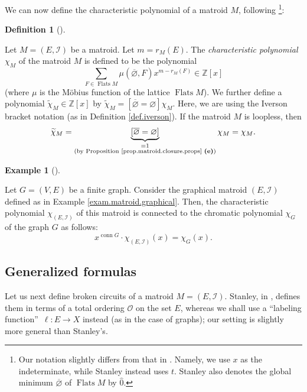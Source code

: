 \documentclass[numbers=enddot,12pt,final,onecolumn,notitlepage]{scrartcl}%
\theoremstyle{definition}
\newtheorem{defi}[theo]{Definition}
\newenvironment{definition}[1][]
{\begin{defi}[#1]\begin{leftbar}}
{\end{leftbar}\end{defi}}
\newtheorem{exmp}[theo]{Example}
\newenvironment{example}[1][]
{\begin{exmp}[#1]\begin{leftbar}}
{\end{leftbar}\end{exmp}}
\let\sumnonlimits\sum
\renewcommand{\sum}{\sumnonlimits\limits}
\begin{document}
We can now define the characteristic polynomial of a matroid $M$, following
\cite[(22)]{Stanley}\footnote{Our notation slightly differs from that in
\cite[(22)]{Stanley}. Namely, we use $x$ as the indeterminate, while Stanley
instead uses $t$. Stanley also denotes the global minimum $\overline
{\varnothing}$ of $\operatorname*{Flats}M$ by $\widehat{0}$.}:

\begin{definition}
\label{def.matroid.charpol}Let $M=\left(  E,\mathcal{I}\right)  $ be a
matroid. Let $m=r_{M}\left(  E\right)  $. The \textit{characteristic
polynomial} $\chi_{M}$ of the matroid $M$ is defined to be the polynomial%
\[
\sum_{F\in\operatorname*{Flats}M}\mu\left(  \overline{\varnothing},F\right)
x^{m-r_{M}\left(  F\right)  }\in\mathbb{Z}\left[  x\right]
\]
(where $\mu$ is the M\"{o}bius function of the lattice $\operatorname*{Flats}%
M$). We further define a polynomial $\widetilde{\chi}_{M}\in\mathbb{Z}\left[
x\right]  $ by $\widetilde{\chi}_{M}=\left[  \overline{\varnothing
}=\varnothing\right]  \chi_{M}$. Here, we are using the Iverson bracket
notation (as in Definition \ref{def.iverson}). If the matroid $M$ is loopless,
then%
\[
\widetilde{\chi}_{M}=\underbrace{\left[  \overline{\varnothing}=\varnothing
\right]  }_{\substack{=1\\\text{(by Proposition
\ref{prop.matroid.closure.props} \textbf{(e)})}}}\chi_{M}=\chi_{M}.
\]

\end{definition}

\begin{example}
\label{exam.matroid.charpol.graph}Let $G=\left(  V,E\right)  $ be a finite
graph. Consider the graphical matroid $\left(  E,\mathcal{I}\right)  $ defined
as in Example \ref{exam.matroid.graphical}. Then, the characteristic
polynomial $\chi_{\left(  E,\mathcal{I}\right)  }$ of this matroid is
connected to the chromatic polynomial $\chi_{G}$ of the graph $G$ as follows:%
\[
x^{\operatorname*{conn}G}\cdot\chi_{\left(  E,\mathcal{I}\right)  }\left(
x\right)  =\chi_{G}\left(  x\right)  .
\]

\end{example}

\subsection{Generalized formulas}

Let us next define broken circuits of a matroid $M=\left(  E,\mathcal{I}%
\right)  $. Stanley, in \cite[\S 4.1]{Stanley}, defines them in terms of a
total ordering $\mathcal{O}$ on the set $E$, whereas we shall use a
\textquotedblleft labeling function\textquotedblright\ $\ell:E\rightarrow X$
instead (as in the case of graphs); our setting is slightly more general than Stanley's.
\end{document}
